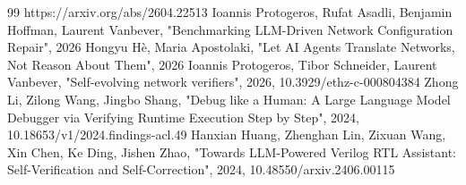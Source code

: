\documentclass[conference]{IEEEtran}
\begin{document}
\begin{thebibliography}{99}
 https://arxiv.org/abs/2604.22513
 Ioannis Protogeros, Rufat Asadli, Benjamin Hoffman, Laurent Vanbever, "Benchmarking LLM-Driven Network Configuration Repair", 2026
 Hongyu Hè, Maria Apostolaki, "Let AI Agents Translate Networks, Not Reason About Them", 2026
 Ioannis Protogeros, Tibor Schneider, Laurent Vanbever, "Self-evolving network verifiers", 2026, 10.3929/ethz-c-000804384
 Zhong Li, Zilong Wang, Jingbo Shang, "Debug like a Human: A Large Language Model Debugger via Verifying Runtime Execution Step by Step", 2024, 10.18653/v1/2024.findings-acl.49
 Hanxian Huang, Zhenghan Lin, Zixuan Wang, Xin Chen, Ke Ding, Jishen Zhao, "Towards LLM-Powered Verilog RTL Assistant: Self-Verification and Self-Correction", 2024, 10.48550/arxiv.2406.00115
\end{thebibliography}
\end{document}

